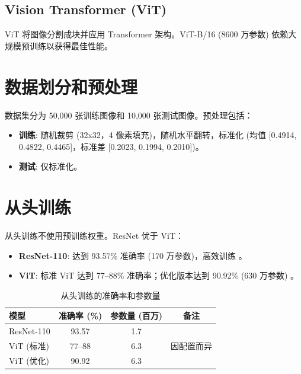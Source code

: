 \documentclass[UTF8]{report}
\theoremstyle{MyLineTheoremStyle} %
\theoremstyle{MyBlockTheoremStyle} %
\theoremstyle{MySubsubsectionStyle} %
\begin{document}
\subsection*{Vision Transformer (ViT)}
ViT 将图像分割成块并应用 Transformer 架构。ViT-B/16 (8600 万参数) 依赖大规模预训练以获得最佳性能。

\section*{数据划分和预处理}
数据集分为 50,000 张训练图像和 10,000 张测试图像。预处理包括：
\begin{itemize}
    \item \textbf{训练}: 随机裁剪 (32x32，4 像素填充)，随机水平翻转，标准化 (均值 [0.4914, 0.4822, 0.4465]，标准差 [0.2023, 0.1994, 0.2010])。
    \item \textbf{测试}: 仅标准化。
\end{itemize}

\section*{从头训练}
从头训练不使用预训练权重。ResNet 优于 ViT：
\begin{itemize}
    \item \textbf{ResNet-110}: 达到 93.57\% 准确率 (170 万参数)，高效训练 \cite{he2016deep}。
    \item \textbf{ViT}: 标准 ViT 达到 77–88\% 准确率；优化版本达到 90.92\% (630 万参数) \cite{omihub777vitcifar, kentaroy47vit}。
\end{itemize}

\begin{table}[h]
\centering
\caption{从头训练的准确率和参数量}
\begin{tabular}{lccc}
\toprule
模型 & 准确率 (\%) & 参数量 (百万) & 备注 \\
\midrule
ResNet-110 & 93.57 & 1.7 & \cite{he2016deep} \\
ViT (标准) & 77–88 & 6.3 & 因配置而异 \cite{kentaroy47vit} \\
ViT (优化) & 90.92 & 6.3 & \cite{omihub777vitcifar} \\
\bottomrule
\end{tabular}
\end{table}
\end{document}
